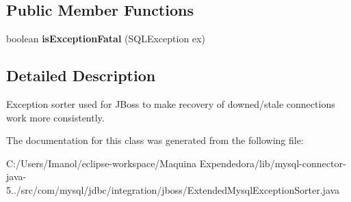 \subsection*{Public Member Functions}
\begin{DoxyCompactItemize}
\item 
\mbox{\label{classcom_1_1mysql_1_1jdbc_1_1integration_1_1jboss_1_1_extended_mysql_exception_sorter_ab5e81a7426e2a2815dbe876803ebfe00}} 
boolean {\bfseries is\+Exception\+Fatal} (S\+Q\+L\+Exception ex)
\end{DoxyCompactItemize}


\subsection{Detailed Description}
Exception sorter used for J\+Boss to make recovery of downed/stale connections work more consistently. 

The documentation for this class was generated from the following file\+:\begin{DoxyCompactItemize}
\item 
C\+:/\+Users/\+Imanol/eclipse-\/workspace/\+Maquina Expendedora/lib/mysql-\/connector-\/java-\/5../src/com/mysql/jdbc/integration/jboss/Extended\+Mysql\+Exception\+Sorter.\+java\end{DoxyCompactItemize}
